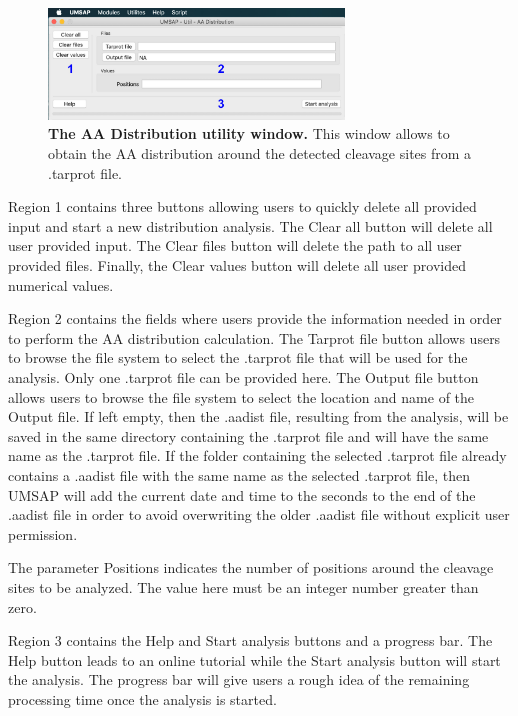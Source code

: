 \begin{figure}[h]
	\centering
	\includegraphics[width=0.7\textwidth]{./IMAGES/UTIL-AA-WINDOW/util-aa.jpg}	    
	\caption[The AA Distribution utility window]{\textbf{The AA Distribution utility window.} This window allows to obtain the AA distribution around the detected cleavage sites from a .tarprot file.} 
	\label{fig:utilAadistCalc}
	\vspace{-5pt} 	
\end{figure}

Region \num{1} contains three buttons allowing users to quickly delete all provided input and start a new distribution analysis. The Clear all button will delete all user provided input. The Clear files button will delete the path to all user provided files. Finally, the Clear values button will delete all user provided numerical values.

Region \num{2} contains the fields where users provide the information needed in order to perform the AA distribution calculation. The Tarprot file button allows users to browse the file system to select the .tarprot file that will be used for the analysis. Only one .tarprot file can be provided here. The Output file button allows users to browse the file system to select the location and name of the Output file. If left empty, then the .aadist file, resulting from the analysis, will be saved in the same directory containing the .tarprot file and will have the same name as the .tarprot file. If the folder containing the selected .tarprot file already contains a .aadist file with the same name as the selected .tarprot file, then UMSAP will add the current date and time to the seconds to the end of the .aadist file in order to avoid overwriting the older .aadist file without explicit user permission.    

The parameter Positions indicates the number of positions around the cleavage sites to be analyzed. The value here must be an integer number greater than zero.

Region \num{3} contains the Help and Start analysis buttons and a progress bar. The Help button leads to an online tutorial while the Start analysis button will start the analysis. The progress bar will give users a rough idea of the remaining processing time once the analysis is started.


